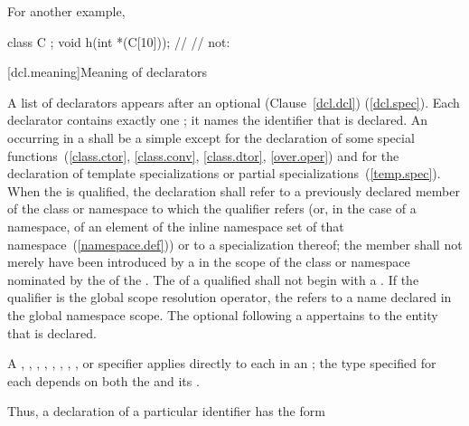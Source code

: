 For another example,

\begin{codeblock}
class C { };
void h(int *(C[10]));           // 
                                // not: 
\end{codeblock}
\exitexample

[dcl.meaning]{Meaning of declarators}%

\pnum
A list of declarators appears after an optional (Clause~\ref{dcl.dcl})
(\ref{dcl.spec}).
%
Each declarator contains exactly one
;
it names the identifier that is declared.
An
occurring in
a
shall be a simple
except for the declaration of some special functions~(\ref{class.ctor},
\ref{class.conv}, \ref{class.dtor}, \ref{over.oper}) and
for the declaration of template specializations
or partial specializations~(\ref{temp.spec}).
When the
is qualified, the declaration shall refer to a previously declared member
of the class or namespace to which the qualifier refers (or,
in the case of a namespace,
of an element of the inline namespace
set of that namespace~(\ref{namespace.def})) or to a specialization thereof; the member
shall not merely have been introduced by a
in the scope of the class or namespace nominated by the
of the
.
The  of a qualified  shall not
begin with a .
\enternote
If the qualifier is the global
\tcode{::}
scope resolution operator, the
refers to a name declared in the global namespace scope.
\exitnote
The optional  following a  appertains to the entity that is declared.

\pnum
A
,
,
,
,
,
,
,
,
or
specifier applies directly to each
in an
;
the type specified for each
depends on both the
and its
.

\pnum
Thus, a declaration of a particular identifier has the form

